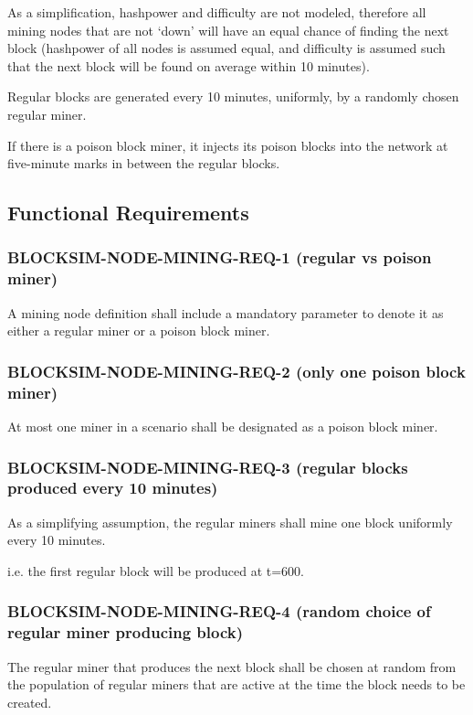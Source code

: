 \documentclass{scrreprt}
\begin{document}
As a simplification, hashpower and difficulty are not modeled, therefore
all mining nodes that are not `down' will have an equal chance of finding
the next block (hashpower of all nodes is assumed equal, and difficulty
is assumed such that the next block will be found on average within 10
minutes).

Regular blocks are generated every 10 minutes, uniformly, by a randomly chosen
regular miner.

If there is a poison block miner, it injects its poison blocks into the network
at five-minute marks in between the regular blocks.


\subsection{Functional Requirements}


\subsubsection{BLOCKSIM-NODE-MINING-REQ-1 (regular vs poison miner)}

A mining node definition shall include a mandatory parameter to denote
it as either a regular miner or a poison block miner.

\subsubsection{BLOCKSIM-NODE-MINING-REQ-2 (only one poison block miner)}

At most one miner in a scenario shall be designated as a poison block
miner.

\subsubsection{BLOCKSIM-NODE-MINING-REQ-3 (regular blocks produced every 10 minutes)}

As a simplifying assumption, the regular miners shall mine one block uniformly
every 10 minutes.

i.e. the first regular block will be produced at t=600.

\subsubsection{BLOCKSIM-NODE-MINING-REQ-4 (random choice of regular miner producing block)}

The regular miner that produces the next block shall be chosen at random
from the population of regular miners that are active at the time the block
needs to be created.
\end{document}
